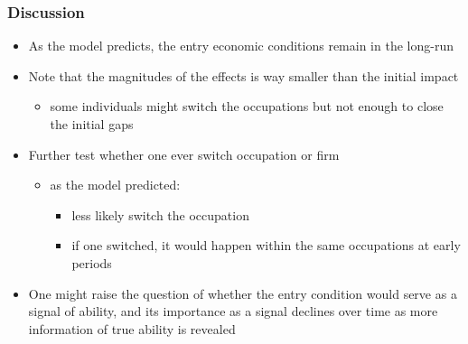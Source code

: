 \documentclass[11pt]{beamer}
\begin{document}
\begin{frame}[label = discussion]
	\frametitle{Discussion}
	\begin{itemize}
		\item As the model predicts, the entry economic conditions remain in the long-run
		\item Note that the magnitudes of the effects is way smaller than the initial impact
		\begin{itemize}
			\item some individuals might switch the occupations but not enough to close the initial gaps
		\end{itemize}
		\item Further test whether one ever switch occupation or firm   \hyperlink{mobility}{}
		\begin{itemize}
			\item as the model predicted:
			\begin{itemize}
				\item less likely switch the occupation
				\item if one switched, it would happen within the same occupations at early periods
			\end{itemize}
		\end{itemize} 
			\item One might raise the question of whether the entry condition would serve as a signal of ability, and its importance as a signal declines over time as more information of true ability is revealed \hyperlink{signal}{}
	\end{itemize}
\end{frame}
\end{document}
